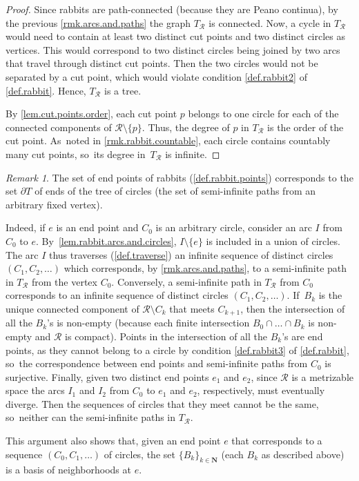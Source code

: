 \documentclass[JEP,XML,SOM,Unicode,NoFloatCountersInSection,published]{cedram}
\theoremstyle{plain}
\theoremstyle{definition}
\theoremstyle{remark}
\newtheorem{remark}[theorem]{Remark}
\newcommand{\R}{\mathcal{R}}
\begin{document}
\begin{proof}
Since rabbits are path-connected (because they are Peano continua), by the previous \cref{rmk.arcs.and.paths} the graph $T_\R$ is connected.
Now, a cycle in $T_\R$ would need to contain at least two distinct cut points and two distinct circles as vertices.
This would correspond to two distinct circles being joined by two arcs that travel through distinct cut points.
Then the two circles would not be separated by a cut point, which would violate condition \cref{def.rabbit2} of \cref{def.rabbit}.
Hence, $T_\R$ is a tree.

By \cref{lem.cut.points.order}, each cut point $p$ belongs to one circle for each of the connected components of $\R \setminus \{p\}$.
Thus, the degree of $p$ in $T_\R$ is the order of the cut point. As~noted in \cref{rmk.rabbit.countable}, each circle contains countably many cut points, so~its degree in~$T_\R$ is infinite.
\end{proof}

\begin{remark}
\label{rmk.rabbit.end.points}
The set of end points of rabbits (\cref{def.rabbit.points}) corresponds to the set $\partial T$ of ends of the tree of circles (\ie the set of semi-infinite paths from an arbitrary fixed vertex).

Indeed, if $e$ is an end point and $C_0$ is an arbitrary circle, consider an arc $I$ from $C_0$ to $e$. By~\cref{lem.rabbit.arcs.and.circles}, $I \setminus \{e\}$ is included in a union of circles. The arc $I$ thus traverses (\cref{def.traverse}) an infinite sequence of distinct circles $(C_1, C_2, \dots)$ which corresponds, by \cref{rmk.arcs.and.paths}, to a semi-infinite path in $T_\R$ from the vertex $C_0$.
Conversely, a semi-infinite path in $T_\R$ from $C_0$ corresponds to an infinite sequence of distinct circles $(C_1, C_2, \dots)$. If~$B_k$ is the unique connected component of $\R \setminus C_k$ that meets $C_{k+1}$, then the intersection of all the $B_k$'s is non-empty (because each finite intersection $B_0 \cap \dots \cap B_k$ is non-empty and $\R$ is compact).
Points in the intersection of all the $B_k$'s are end points, as they cannot belong to a circle by condition \cref{def.rabbit3} of \cref{def.rabbit}, so~the correspondence between end points and semi-infinite paths from $C_0$ is surjective.
Finally, given two distinct end points $e_1$ and $e_2$, since $\R$ is a metrizable space the arcs $I_1$ and $I_2$ from $C_0$ to $e_1$ and $e_2$, respectively, must eventually diverge.
Then the sequences of circles that they meet cannot be the same, so~neither can the semi-infinite paths in $T_\R$.

This argument also shows that, given an end point $e$ that corresponds to a sequence $(C_0, C_1, \dots)$ of circles, the set $\{ B_k \}_{k \in \mathbf{N}}$ (each $B_k$ as described above) is a basis of neighborhoods at $e$.
\end{remark}
\end{document}
